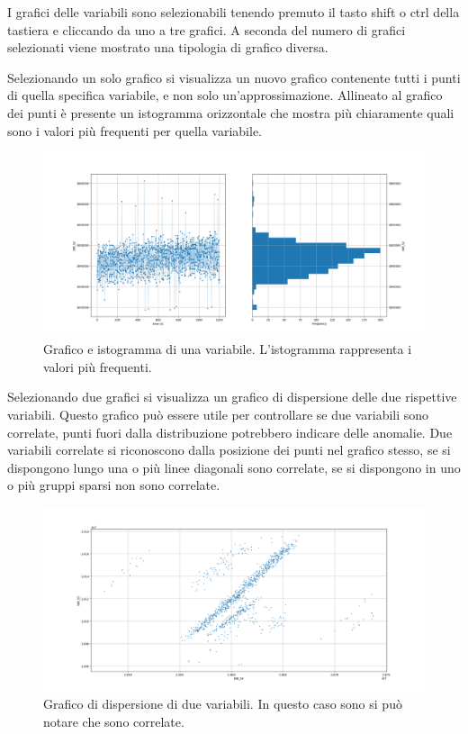I grafici delle variabili sono selezionabili tenendo premuto il tasto shift o ctrl della tastiera e cliccando da uno a tre grafici. A seconda del numero di grafici selezionati viene mostrato una tipologia di grafico diversa.

Selezionando un solo grafico si visualizza un nuovo grafico contenente tutti i punti di quella specifica variabile, e non solo un'approssimazione. Allineato al grafico dei punti è presente un istogramma orizzontale che mostra più chiaramente quali sono i valori più frequenti per quella variabile.

\begin{figure}[H]
	\includegraphics[width=\textwidth]{figures/SimplePlotHistogram}
	\caption[Grafico e istogramma di una variabile]{ Grafico e istogramma di una variabile. L'istogramma rappresenta i valori più frequenti.
		\label{fig:SimplePlotHistogram}}
\end{figure}


Selezionando due grafici si visualizza un grafico di dispersione delle due rispettive variabili. Questo grafico può essere utile per controllare se due variabili sono correlate, punti fuori dalla distribuzione potrebbero indicare delle anomalie. Due variabili correlate si riconoscono dalla posizione dei punti nel grafico stesso, se si dispongono lungo una o più linee diagonali sono correlate, se si dispongono in uno o più gruppi sparsi non sono correlate.

\begin{figure}[H]
	\includegraphics[width=\textwidth]{figures/2Dscatter}
	\caption[Grafico di dispersione di due variabili]{ Grafico di dispersione di due variabili. In questo caso sono si può notare che sono correlate.
		\label{fig:2Dscatter}}
\end{figure}

